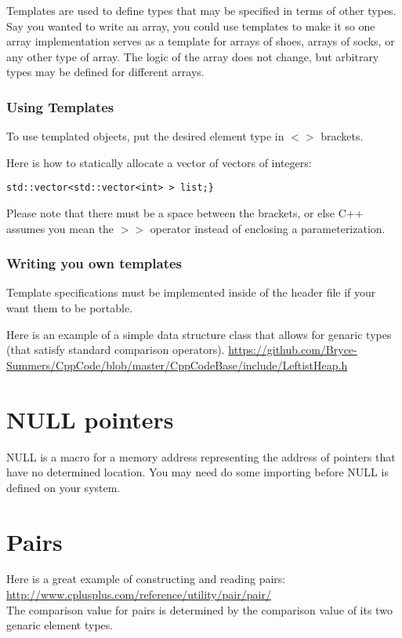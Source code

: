 \documentclass[12pt, letterpaper]{article}
\begin{document}
Templates are used to define types that may be specified in terms of other types. Say you wanted to write an array, you could use templates to make it so one array implementation serves as a template for arrays of shoes, arrays of socks, or any other type of array. The logic of the array does not change, but arbitrary types may be defined for different arrays.

\subsubsection{Using Templates}

To use templated objects, put the desired element type in $<>$ brackets.

Here is how to statically allocate a vector of vectors of integers:

\begin{verbatim}
std::vector<std::vector<int> > list;}
\end{verbatim}
Please note that there must be a space between the brackets, or else C++ assumes you mean the $>>$ operator instead of enclosing a parameterization.

\subsubsection{Writing you own templates}
Template specifications must be implemented inside of the header file if your want them to be portable.

Here is an example of a simple data structure class that allows for genaric types (that satisfy standard comparison operators).
\href{https://github.com/Bryce-Summers/CppCode/blob/master/CppCodeBase/include/LeftistHeap.h}{https://github.com/Bryce-Summers/CppCode/blob/master/CppCodeBase/include/LeftistHeap.h}

\section{NULL pointers}

NULL is a macro for a memory address representing the address of pointers that have no determined location. You may need do some importing before NULL is defined on your system.

\section{Pairs}
Here is a great example of constructing and reading pairs:\\

\href{http://www.cplusplus.com/reference/utility/pair/pair/}{http://www.cplusplus.com/reference/utility/pair/pair/}\\

The comparison value for pairs is determined by the comparison value of its two genaric element types.
\end{document}
